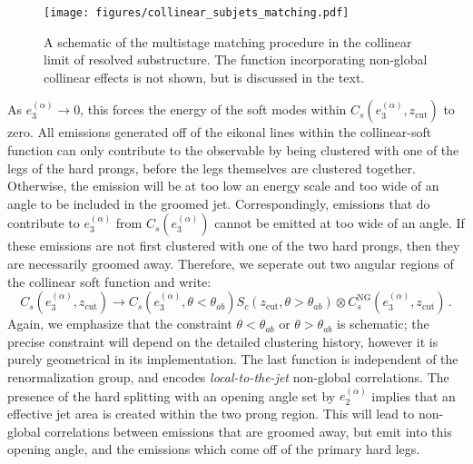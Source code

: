 \documentclass[a4paper,11pt]{article}
\newcommand{\ecf}[2]{e_{#1}^{(#2)}}
\def\zcut{z_{\text{cut}}}
\begin{document}
\begin{figure}
\begin{center}
\texttt{[image: figures/collinear\_subjets\_matching.pdf]}
\end{center}
\caption{A schematic of the multistage matching procedure in the collinear limit of resolved substructure. The function incorporating non-global collinear effects is not shown, but is discussed in the text.
}
\label{fig:collinear_subjets_setup}
\end{figure}



As $\ecf{3}{\alpha}\rightarrow 0$, this forces the energy of the soft modes within $C_s(\ecf{3}{\alpha},\zcut)$ to zero. All emissions generated off of the eikonal lines within the collinear-soft function can only contribute to the observable by being clustered with one of the legs of the hard prongs, before the legs themselves are clustered together. Otherwise, the emission will be at too low an energy scale and too wide of an angle to be included in the groomed jet.  Correspondingly, emissions that do contribute to $\ecf{3}{\alpha}$ from $C_s(\ecf{3}{\alpha})$ cannot be emitted at too wide of an angle.  If these emissions are not first clustered with one of the two hard prongs, then they are necessarily groomed away.  Therefore, we seperate out two angular regions of the collinear soft function and write:
\begin{equation}\label{eq:collinear_soft_mother_f}
C_s(\ecf{3}{\alpha},\zcut) \to C_s(\ecf{3}{\alpha},\theta<\theta_{ab})S_{c}(\zcut,\theta>\theta_{ab})\otimes C_s^{\text{NG}}(\ecf{3}{\alpha},\zcut) \,.
\end{equation}
Again, we emphasize that the constraint $\theta<\theta_{ab}$ or $\theta>\theta_{ab}$ is schematic; the precise constraint will depend on the detailed clustering history, however it is purely geometrical in its implementation. The last function is independent of the renormalization group, and encodes \emph{local-to-the-jet} non-global correlations. The presence of the hard splitting with an opening angle set by $\ecf{2}{\alpha}$ implies that an effective jet area is created within the two prong region. This will lead to non-global correlations between emissions that are groomed away, but emit into this opening angle, and the emissions which come off of the primary hard legs.
\end{document}
